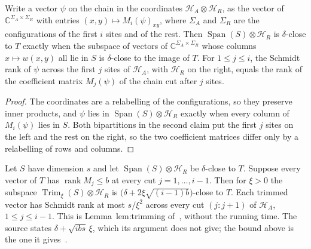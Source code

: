 \begin{lemma}
    \label{thm:alvv_collective_trim_coordinates}
    \leanok
    Write a vector $\psi$ on the chain in the coordinates
    $\mathcal H_A\otimes\mathcal H_R$, as the vector of
    $\mathbb C^{\Sigma_A\times\Sigma_R}$ with entries
    $(x,y)\mapsto M_i(\psi)_{xy}$, where $\Sigma_A$ and $\Sigma_R$ are the
    configurations of the first $i$ sites and of the rest. Then
    $\operatorname{Span}(S)\otimes\mathcal H_R$ is $\delta$-close to $T$
    exactly when the subspace of vectors of $\mathbb C^{\Sigma_A\times
                \Sigma_R}$ whose columns $x\mapsto w(x,y)$ all lie in $S$ is
    $\delta$-close to the image of $T$. For $1\le j\le i$, the Schmidt rank of $\psi$
    across the first $j$ sites of $\mathcal H_A$, with $\mathcal H_R$ on the
    right, equals the rank of the coefficient matrix $M_j(\psi)$ of the chain
    cut after $j$ sites.
\end{lemma}

\begin{proof}
    \leanok
    The coordinates are a relabelling of the configurations, so they preserve
    inner products, and $\psi$ lies in $\operatorname{Span}(S)\otimes
        \mathcal H_R$ exactly when every column of $M_i(\psi)$ lies in $S$. Both
    bipartitions in the second claim put the first $j$ sites on the left and
    the rest on the right, so the two coefficient matrices differ only by a
    relabelling of rows and columns.
\end{proof}

\begin{theorem}
    \label{thm:alvv_collective_trim}
    \leanok
    Let $S$ have dimension $s$ and let $\operatorname{Span}(S)\otimes
        \mathcal H_R$ be $\delta$-close to $T$. Suppose every vector of $T$ has
    $\operatorname{rank}M_j\le b$ at every cut $j=1,\dots,i-1$. Then for
    $\xi>0$ the subspace $\operatorname{Trim}_\xi(S)\otimes\mathcal H_R$ is
    $\big(\delta+2\xi\sqrt{(i-1)b}\big)$-close to $T$. Each trimmed vector
    has Schmidt rank at most $s/\xi^2$ across every cut $(j:j+1)$ of
    $\mathcal H_A$, $1\le j\le i-1$.
    This is Lemma~lem:trimming of~\cite[lines 660--697]{Arad2016RigorousRG},
    without the running time. The source states $\delta+\sqrt{ibs}\,\xi$, which
    its argument does not give; the bound above is the one it
    gives~\cite{gap:alvv16_trimming_constant}.
\end{theorem}

